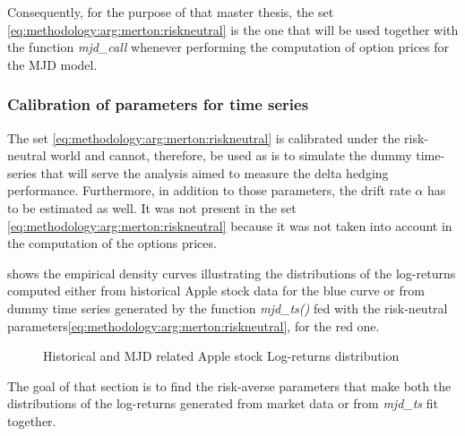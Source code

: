 \documentclass[12pt]{report}
\begin{document}
Consequently, for the purpose of that master thesis, the set \ref{eq:methodology:arg:merton:riskneutral} is the one that will be used together with the function \textit{mjd\_call} whenever performing the computation of option prices for the MJD model.





\subsubsection*{Calibration of parameters for time series}

The set \ref{eq:methodology:arg:merton:riskneutral} is calibrated under the risk-neutral world and cannot, therefore, be used as is to simulate the dummy time-series that will serve the analysis aimed to measure the delta hedging performance.
Furthermore, in addition to those parameters, the drift rate $\alpha$ has to be estimated as well. It was not present in the set  \ref{eq:methodology:arg:merton:riskneutral} because it was not taken into account in the computation of the options prices.

 shows the empirical density curves illustrating the distributions of the log-returns computed either from historical Apple stock data for the blue curve or from dummy time series generated by the function \textit{mjd\_ts()} fed with the risk-neutral parameters\ref{eq:methodology:arg:merton:riskneutral}, for the red one.


\begin{figure}[ht]
  \centering
  
  \caption{Historical and MJD related Apple stock Log-returns distribution}
  \label{p:methodology:density:aapl:merton:riskneutral}
\end{figure}



The goal of that section is to find the risk-averse parameters that make both the distributions of the log-returns generated from market data or from \textit{mjd\_ts} fit together.
\end{document}
